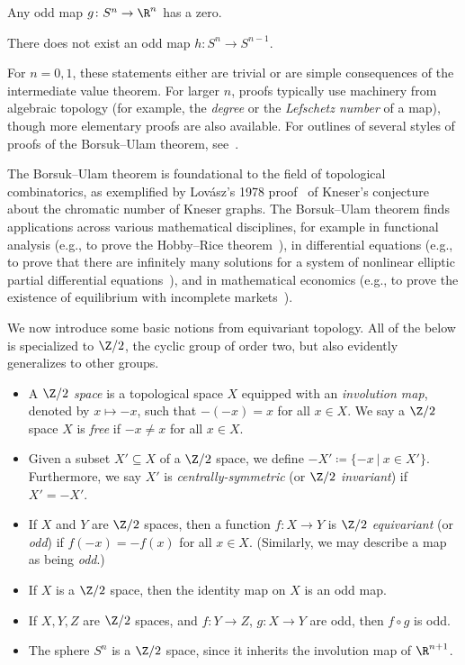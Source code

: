 \documentclass[11pt, reqno, english]{amsart}
\begin{document}
\begin{theorem}
\label{thm:borsuk-ulam-alternate}
Any odd map $g \colon S^{n} \to \R^{n}$ has a zero.
\end{theorem}

\begin{theorem}
\label{thm:borsuk-ulam-odd}
There does not exist an odd map $h \colon S^{n} \to S^{n - 1}$.
\end{theorem}

For $n = 0, 1$, these statements either are trivial or are simple consequences of the intermediate value theorem.
For larger $n$, proofs typically use machinery from algebraic topology (for example, the \emph{degree} or the \emph{Lefschetz number} of a map), though more elementary proofs are also available.
For outlines of several styles of proofs of the Borsuk--Ulam theorem, see~\cite{steinlein1993spheres, matousek2003using}.

The Borsuk--Ulam theorem is foundational to the field of topological combinatorics, as exemplified by Lovász's 1978 proof~\cite{Lovasz1978} of Kneser's conjecture about the chromatic number of Kneser graphs.
The Borsuk--Ulam theorem finds applications across various mathematical disciplines, for example in functional analysis (e.g., to prove the Hobby--Rice theorem~\cite{hobby1965moment}), in differential equations (e.g., to prove that there are infinitely many solutions for a system of nonlinear elliptic partial differential equations~\cite{michalek1989zp}), and in mathematical economics (e.g., to prove the existence of equilibrium with incomplete markets~\cite{husseini1990existence}).

We now introduce some basic notions from equivariant topology.
All of the below is specialized to $\Z/2$, the cyclic group of order two, but also evidently generalizes to other groups.

\begin{itemize}
\item
A \emph{$\Z/2$ space} is a topological space $X$ equipped with an \emph{involution map}, denoted by $x \mapsto -x$, such that $-(-x) = x$ for all $x \in X$.
We say a $\Z/2$ space $X$ is \emph{free} if $-x \ne x$ for all $x \in X$.
\item Given a subset $X'\subseteq X$ of a $\Z/2$ space, we define $-X'\coloneqq\{-x~|~x\in X'\}$.
Furthermore, we say $X'$ is \emph{centrally-symmetric} (or \emph{$\Z/2$ invariant}) if $X'=-X'$.
\item
If $X$ and $Y$ are $\Z/2$ spaces, then a function $f \colon X \to Y$ is \emph{$\Z/2$ equivariant} (or \emph{odd}) if $f(-x) = -f(x)$ for all $x \in X$.
(Similarly, we may describe a map as being \emph{odd}.)
\item
If $X$ is a $\Z/2$ space, then the identity map on $X$ is an odd map.
\item
If $X, Y, Z$ are $\Z/2$ spaces, and $f \colon Y \to Z$, $g \colon X \to Y$ are odd, then $f \circ g$ is odd.
\item
The sphere $S^{n}$ is a $\Z/2$ space, since it inherits the involution map of $\R^{n + 1}$.
\end{itemize}
\end{document}
